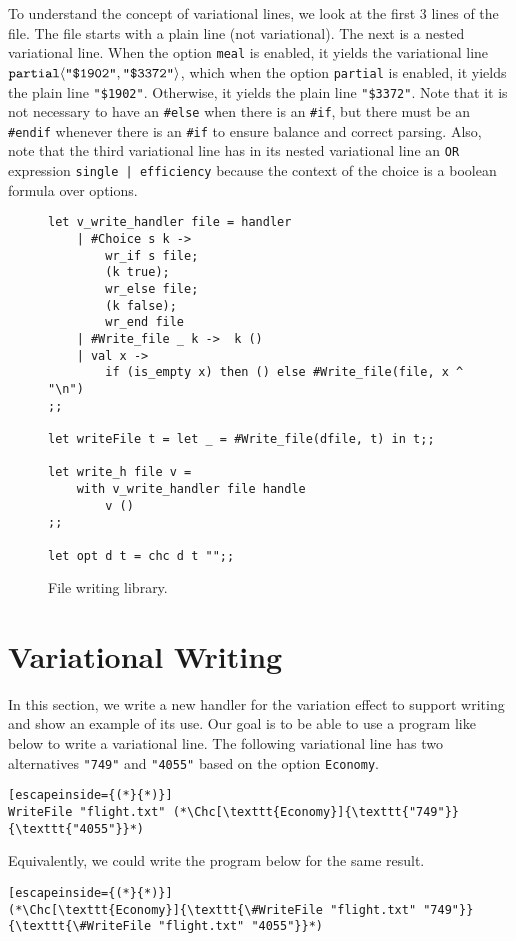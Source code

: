 To understand the concept of variational lines, we look at the first 3 lines of the file. The file starts with a plain line (not variational). The next is a nested variational line. When the option \texttt{meal} is enabled, it yields the variational line $\Chc[\texttt{partial}]{\texttt{"\$1902"}}{\texttt{"\$3372"}}$, which when the option \texttt{partial} is enabled, it yields the plain line \texttt{"\$1902"}. Otherwise, it yields the plain line \texttt{"\$3372"}. Note that it is not necessary to have an \texttt{\#else} when there is an \texttt{\#if}, but there must be an \texttt{\#endif} whenever there is an \texttt{\#if} to ensure balance and correct parsing. Also, note that the third variational line has in its nested variational line an \texttt{OR} expression \texttt{single | efficiency} because the context of the choice is a boolean formula over options. 

\begin{figure}[h]
\begin{lstlisting}
let v_write_handler file = handler
    | #Choice s k ->
        wr_if s file;
        (k true);
        wr_else file;
        (k false);
        wr_end file 
    | #Write_file _ k ->  k ()
    | val x ->
        if (is_empty x) then () else #Write_file(file, x ^ "\n")
;;

let writeFile t = let _ = #Write_file(dfile, t) in t;;

let write_h file v =
    with v_write_handler file handle
        v ()
;;

let opt d t = chc d t "";;
\end{lstlisting}
\caption{File writing library.}
\label{fig:write-lib}
\end{figure}

\section{Variational Writing}
\label{sec:file_write}

In this section, we write a new handler for the variation effect to support writing and show an example of its use. Our goal is to be able to use a program like below to write a variational line. The following variational line has two alternatives \texttt{"749"} and \texttt{"4055"} based on the option \texttt{Economy}.
%
\begin{lstlisting}[escapeinside={(*}{*)}]
WriteFile "flight.txt" (*\Chc[\texttt{Economy}]{\texttt{"749"}}{\texttt{"4055"}}*)
\end{lstlisting}
%
Equivalently, we could write the program below for the same result. 
%
\begin{lstlisting}[escapeinside={(*}{*)}]
(*\Chc[\texttt{Economy}]{\texttt{\#WriteFile "flight.txt" "749"}}{\texttt{\#WriteFile "flight.txt" "4055"}}*)
\end{lstlisting}

